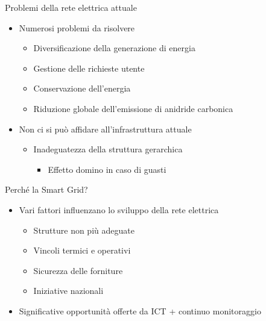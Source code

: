 \begin{frame}{Problemi della rete elettrica attuale}
	\begin{itemize}[<+- | alert@+>]
	\item Numerosi problemi da risolvere
		\begin{itemize}
		\item Diversificazione della generazione di energia
		\item Gestione delle richieste utente
		\item Conservazione dell’energia
		\item Riduzione globale dell’emissione di anidride carbonica
		\end{itemize}
	\item Non ci si può affidare all'infrastruttura attuale
		\begin{itemize}
			\item Inadeguatezza della struttura gerarchica
			 	\begin{itemize}
			 	\item Effetto domino in caso di guasti
			 	\end{itemize}
		\end{itemize}
	\end{itemize}
\end{frame}


\begin{frame}{Perché la Smart Grid?}
	\begin{itemize}[<+- | alert@+>]
	\item Vari fattori influenzano lo sviluppo della rete elettrica
	 \begin{itemize}
	  	\item Strutture non più adeguate
	  	\item Vincoli termici e operativi
	  	\item Sicurezza delle forniture
	  	\item Iniziative nazionali
	 \end{itemize}
	\item Significative opportunità offerte da ICT + continuo monitoraggio
	\end{itemize}
\end{frame}


